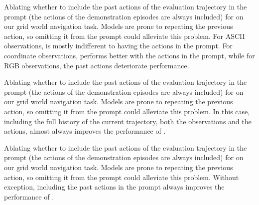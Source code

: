 \begin{table}
    \caption{
        Ablating whether to include the past actions of the evaluation trajectory in the prompt (the actions of the demonstration episodes are always included) for \claude{} on our grid world navigation task.
        Models are prone to repeating the previous action, so omitting it from the prompt could alleviate this problem.
        For ASCII observations, \claude{} is mostly indifferent to having the actions in the prompt.
        For coordinate observations, \claude{} performs better with the actions in the prompt, while for RGB observations, the past actions deteriorate performance.
    }
    \begin{center}
        \resizebox{0.65\textwidth}{!}{}
    \end{center}
    \label{tab:past-actions-ablation-anthropic}
\end{table}

\begin{table}
    \caption{
        Ablating whether to include the past actions of the evaluation trajectory in the prompt (the actions of the demonstration episodes are always included) for \flash{} on our grid world navigation task.
        Models are prone to repeating the previous action, so omitting it from the prompt could alleviate this problem.
        In this case, including the full history of the current trajectory, \ie both the observations and the actions, almost always improves the performance of \flash{}.
    }
    \begin{center}
        \resizebox{0.65\textwidth}{!}{}
    \end{center}
    \label{tab:past-actions-ablation-gemini-flash}
\end{table}

\begin{table}
    \caption{
        Ablating whether to include the past actions of the evaluation trajectory in the prompt (the actions of the demonstration episodes are always included) for \pro{} on our grid world navigation task.
        Models are prone to repeating the previous action, so omitting it from the prompt could alleviate this problem.
        Without exception, including the past actions in the prompt always improves the performance of \pro{}.
    }
    \begin{center}
        \resizebox{0.65\textwidth}{!}{}
    \end{center}
    \label{tab:past-actions-ablation-gemini-pro}
\end{table}


